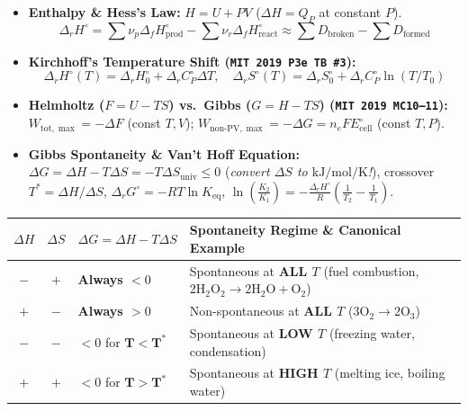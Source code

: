 \documentclass[10pt,twoside,openany,letterpaper]{book}
\begin{document}
\begin{quicksheet}
\begin{twocol}[0.51]
\begin{formulacard}
\scriptsize
\begin{itemize}
  \item \textbf{Enthalpy \& Hess's Law:} $H = U + PV$ ($\Delta H = Q_P$ at constant $P$).
  \[
    \Delta_r H^\circ = \sum\nu_p\Delta_f H_{\mathrm{prod}}^\circ - \sum\nu_r\Delta_f H_{\mathrm{react}}^\circ \approx \sum D_{\mathrm{broken}} - \sum D_{\mathrm{formed}}
  \]
  \item \textbf{Kirchhoff's Temperature Shift (\texttt{MIT 2019 P3e TB~\#3}):}
  \[
    \Delta_r H^\circ(T) = \Delta_r H_0^\circ + \Delta_r C_P^\circ\Delta T, \quad \Delta_r S^\circ(T) = \Delta_r S_0^\circ + \Delta_r C_P^\circ\ln(T/T_0)
  \]
  \item \textbf{Helmholtz ($F=U-TS$) vs.\ Gibbs ($G=H-TS$) (\texttt{MIT 2019 MC10--11}):}
  $W_{\mathrm{tot,\max}} = -\Delta F$ (const $T,V$); $W_{\mathrm{non\text{-}PV,\max}} = -\Delta G = n_e F E_{\mathrm{cell}}^\circ$ (const $T,P$).
  \item \textbf{Gibbs Spontaneity \& Van't Hoff Equation:} $\boxed{\Delta G = \Delta H - T\Delta S = -T\Delta S_{\mathrm{univ}} \le 0}$ (\emph{convert $\Delta S$ to $\si{\kilo\joule\per\mole\per\kelvin}$!}), crossover $\boxed{T^* = \Delta H/\Delta S}$, $\boxed{\Delta_r G^\circ = -RT\ln K_{\mathrm{eq}}}$, $\displaystyle \ln\left(\frac{K_2}{K_1}\right) = -\frac{\Delta_r H^\circ}{R}\left(\frac{1}{T_2} - \frac{1}{T_1}\right)$.
\end{itemize}
\par\smallskip\noindent
\scriptsize\setlength{\tabcolsep}{2.2pt}\renewcommand{\arraystretch}{1.08}
\begin{tabularx}{\linewidth}{@{}c c l X@{}}
\toprule
$\Delta H$ & $\Delta S$ & $\Delta G = \Delta H - T\Delta S$ & \textbf{Spontaneity Regime \& Canonical Example} \\
\midrule
$-$ & $+$ & \textbf{Always $< 0$} & Spontaneous at \textbf{ALL $T$} (fuel combustion, $2\mathrm{H_2O_2}\to 2\mathrm{H_2O}+\mathrm{O_2}$) \\
$+$ & $-$ & \textbf{Always $> 0$} & Non-spontaneous at \textbf{ALL $T$} ($3\mathrm{O_2}\to 2\mathrm{O_3}$) \\
$-$ & $-$ & $< 0$ for $\mathbf{T < T^*}$ & Spontaneous at \textbf{LOW $T$} (freezing water, condensation) \\
$+$ & $+$ & $< 0$ for $\mathbf{T > T^*}$ & Spontaneous at \textbf{HIGH $T$} (melting ice, boiling water) \\

\end{tabularx}
\end{formulacard}
\end{twocol}
\end{quicksheet}
\end{document}
